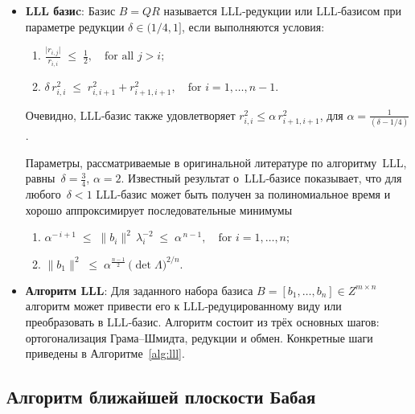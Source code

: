 \begin{itemize}
    \item \textbf{LLL базиc}: Базис $B = QR$ называется LLL‑редукции или
        LLL‑базисом при параметре редукции $\delta\in(1/4,1]$, если выполняются
        условия:
        \begin{enumerate}
            \item $\frac{\lvert r_{i,j}\rvert}{r_{i,i}} \;\le\; \frac12, \quad \text{for all } j > i;$
            \item $\delta\, r_{i,i}^{2}\;\le\;r_{i,i+1}^{2} + r_{i+1,i+1}^{2},\quad \text{for } i = 1,\ldots,n-1.$
            \setcounter{tmp-enum-lll}{\value{enumi}}
        \end{enumerate}

        Очевидно, LLL‑базис также удовлетворяет
        \( r_{i,i}^{2} \le \alpha\, r_{i+1,i+1}^{2} \),
        для \(\alpha = \frac{1}{(\delta - 1 / 4)}\).

        Параметры, рассматриваемые в оригинальной литературе по алгоритму LLL,
        равны $\delta = \tfrac34$, $\alpha = 2$. Известный результат о LLL‑базисе
        показывает, что для любого $\delta < 1$ LLL‑базис может быть получен за
        полиномиальное время и хорошо аппроксимирует последовательные минимумы\:

        \begin{enumerate}
            \setcounter{enumi}{\value{tmp-enum-lll}}
            \item $\alpha^{-\,i+1} \;\le\; \lVert b_{i}\rVert^{2}\,\lambda_{i}^{-2}
                \;\le\; \alpha^{\,n-1}, \quad \text{for } i = 1,\ldots,n;$
            \item $\lVert b_{1}\rVert^{2} \;\le\; \alpha^{\frac{n-1}{2}}\,
                \bigl(\det\Lambda\bigr)^{2/n}.$
        \end{enumerate}

    \item \textbf{Алгоритм LLL}: Для заданного набора базиса
        $B = [b_{1},\ldots,b_{n}] \in Z^{m\times n}$
        алгоритм может привести его к LLL‑редуцированному виду
        или преобразовать в LLL‑базис. Алгоритм состоит из трёх
        основных шагов: ортогонализация Грама–Шмидта, редукции и
        обмен. Конкретные шаги приведены в Алгоритме \ref{alg:lll}.
\end{itemize}

\subsection*{Алгоритм ближайшей плоскости Бабая}

